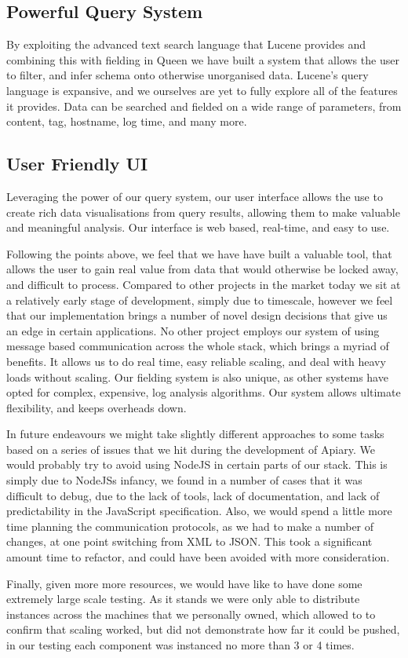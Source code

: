 \subsection{Powerful Query System} By exploiting the advanced text search
language that Lucene provides and combining this with fielding in Queen we have
built a system that allows the user to filter, and infer schema onto otherwise
unorganised data. Lucene's query language is expansive, and we ourselves are yet
to fully explore all of the features it provides. Data can be searched and
fielded on a wide range of parameters, from content, tag, hostname, log time,
and many more.


\subsection{User Friendly UI} Leveraging the power of our query system, our user
interface allows the use to create rich data visualisations from query results,
allowing them to make valuable and meaningful analysis. Our interface is web
based, real-time, and easy to use.

\vspace{5mm}

Following the points above, we feel that we have have built a valuable tool,
that allows the user to gain real value from data that would otherwise be locked
away, and difficult to process. Compared to other projects in the market today
we sit at a relatively early stage of development, simply due to timescale,
however we feel that our implementation brings a number of novel design
decisions that give us an edge in certain applications. No other project employs
our system of using message based communication across the whole stack, which
brings a myriad of benefits. It allows us to do real time, easy reliable
scaling, and deal with heavy loads without scaling. Our fielding system is also
unique, as other systems have opted for complex, expensive, log analysis
algorithms. Our system allows ultimate flexibility, and keeps overheads down.

In future endeavours we might take slightly different approaches to some tasks
based on a series of issues that we hit during the development of Apiary. We
would probably try to avoid using NodeJS in certain parts of our stack. This is
simply due to NodeJSs infancy, we found in a number of cases that it was
difficult to debug, due to the lack of tools, lack of documentation, and lack of
predictability in the JavaScript specification. Also, we would spend a little
more time planning the communication protocols, as we had to make a number of
changes, at one point switching from XML to JSON. This took a significant amount
time to refactor, and could have been avoided with more consideration.

Finally, given more more resources, we would have like to have done some
extremely large scale testing. As it stands we were only able to distribute
instances across the machines that we personally owned, which allowed to to
confirm that scaling worked, but did not demonstrate how far it could be pushed,
in our testing each component was instanced no more than 3 or 4 times.
